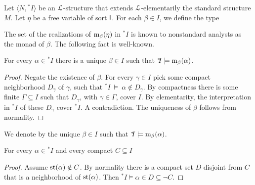 \documentclass[10pt,oneside]{amsproc}
\renewcommand*{\emph}[1]{%
   \smash{\tikz[baseline]\node[rectangle, fill=teal!25, rounded corners, inner xsep=0.5ex, inner ysep=0.2ex, anchor=base, minimum height = 2.7ex]{\strut #1};}}
\begin{document}
Let $\langle N, {}^*\!\!I\rangle$ be an ${\EuScript L}$-structure that extends ${\EuScript L}$-elementarily the standard structure $M$. %
Let $\eta$ be a free variable of sort ${\sf I}$.
For each $\beta\in I$, we define the type


The set of the realizations of ${\rm m}_\beta(\eta)$ in ${}^*\!\!I$ is known to nonstandard analysts as the monad of $\beta$. 
The following fact is well-known.

\begin{fact}\label{fact_uniqueness_st}
  For every $\alpha\in{}^*\!\!I$ there is a unique $\beta\in I$ such that ${}^*\!\!I\models{\rm m}_\beta(\alpha)$.
\end{fact}

\begin{proof}
  Negate the existence of $\beta$.
  For every $\gamma\in I$ pick some compact neighborhood $D_\gamma$ of $\gamma$, such that ${}^*\!\!I\ \models\ \alpha\notin D_\gamma$.
  By compactness there is some finite $\Gamma\subseteq I$ such that $D_\gamma$, with $\gamma\in\Gamma$, cover $I$.
  By elementarity, the interpretation in ${}^*\!\!I$ of these $D_{\gamma}$ cover ${}^*\!\!I$.
  A contradiction.
  The uniqueness of $\beta$ follows from normality.
\end{proof}

We denote by \emph{${\rm st}(\alpha)$\/} the unique $\beta\in I$ such that ${}^*\!\!I\models{\rm m}_\beta(\alpha)$.

\begin{fact}\label{fact_st1}
  For every $\alpha\in{}^*\! I$ and every compact $C\subseteq I$

\end{fact}

\begin{proof}
  Assume ${\rm st}(\alpha)\notin C$.
  By normality there is a compact set $D$ disjoint from $C$ that is a neighborhood of ${\rm st}(\alpha)$.
  Then  ${}^*\!\!I\models\alpha\in D\subseteq\neg C$.
\end{proof}
\end{document}
